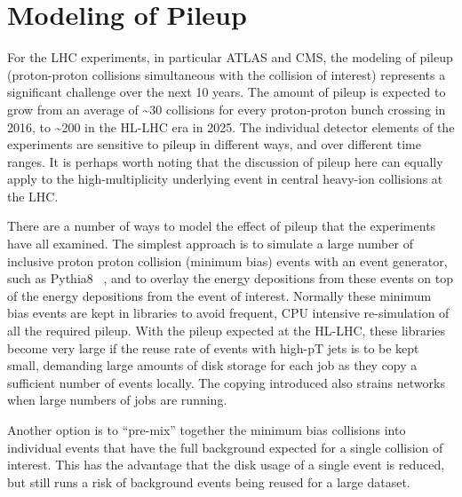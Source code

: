 \documentclass[12pt,a4paper]{article}
\begin{document}
\hypertarget{modeling-of-pileup}{%
\section{Modeling of Pileup}\label{modeling-of-pileup}}

For the LHC experiments, in particular ATLAS and CMS, the modeling of
pileup (proton-proton collisions simultaneous with the collision of
interest) represents a significant challenge over the next 10 years. The
amount of pileup is expected to grow from an average of
\textasciitilde{}30 collisions for every proton-proton bunch crossing in
2016, to \textasciitilde{}200 in the HL-LHC era in 2025. The individual
detector elements of the experiments are sensitive to pileup in
different ways, and over different time ranges. It is perhaps worth
noting that the discussion of pileup here can equally apply to the
high-multiplicity underlying event in central heavy-ion collisions at
the LHC.

There are a number of ways to model the effect of pileup that the
experiments have all examined. The simplest approach is to simulate a
large number of inclusive proton proton collision (minimum bias) events
with an event generator, such as Pythia8 ~\cite{Sjostrand:2014zea}, and to overlay the
energy depositions from these events on top of the energy depositions
from the event of interest. Normally these minimum bias events are kept
in libraries to avoid frequent, CPU intensive re-simulation of all the
required pileup. With the pileup expected at the HL-LHC, these libraries
become very large if the reuse rate of events with high-pT jets is to be
kept small, demanding large amounts of disk storage for each job as they
copy a sufficient number of events locally. The copying introduced also
strains networks when large numbers of jobs are running.

Another option is to ``pre-mix'' together the minimum bias collisions
into individual events that have the full background expected for a
single collision of interest. This has the advantage that the disk usage
of a single event is reduced, but still runs a risk of background events
being reused for a large dataset.
\end{document}

